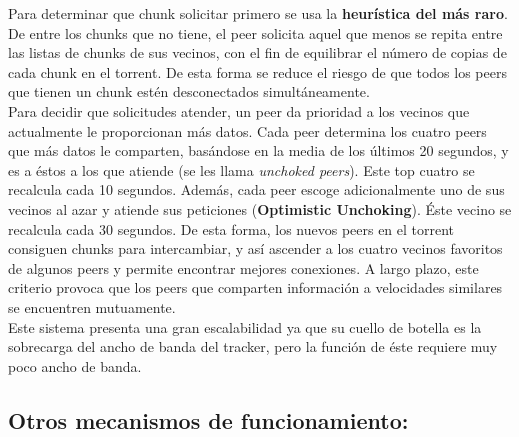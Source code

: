 \documentclass{article}
\begin{document}
Para determinar que chunk solicitar primero se usa la \textbf{heurística del más raro}. De entre los chunks que no tiene, el peer solicita aquel que menos se repita entre las listas de chunks de sus vecinos, con el fin de equilibrar el número de copias de cada chunk en el torrent. De esta forma se reduce el riesgo de que todos los peers que tienen un chunk estén desconectados simultáneamente.\\

Para decidir que solicitudes atender, un peer da prioridad a los vecinos que actualmente le proporcionan más datos. Cada peer determina los cuatro peers que más datos le comparten, basándose en la media de los últimos 20 segundos, y es a éstos a los que atiende (se les llama \textit{unchoked peers}). Este top cuatro se recalcula cada 10 segundos. Además, cada peer escoge adicionalmente uno de sus vecinos al azar y atiende sus peticiones (\textbf{Optimistic Unchoking}). Éste vecino se recalcula cada 30 segundos. De esta forma, los nuevos peers en el torrent consiguen chunks para intercambiar, y así ascender a los cuatro vecinos favoritos de algunos peers y permite encontrar mejores conexiones. A largo plazo, este criterio provoca que los peers que comparten información a velocidades similares se encuentren mutuamente.\\

Este sistema presenta una gran escalabilidad ya que su cuello de
botella es la sobrecarga del ancho de banda del tracker, pero la
función de éste requiere muy poco ancho de banda.

\subsection{Otros mecanismos de funcionamiento:}
\end{document}
